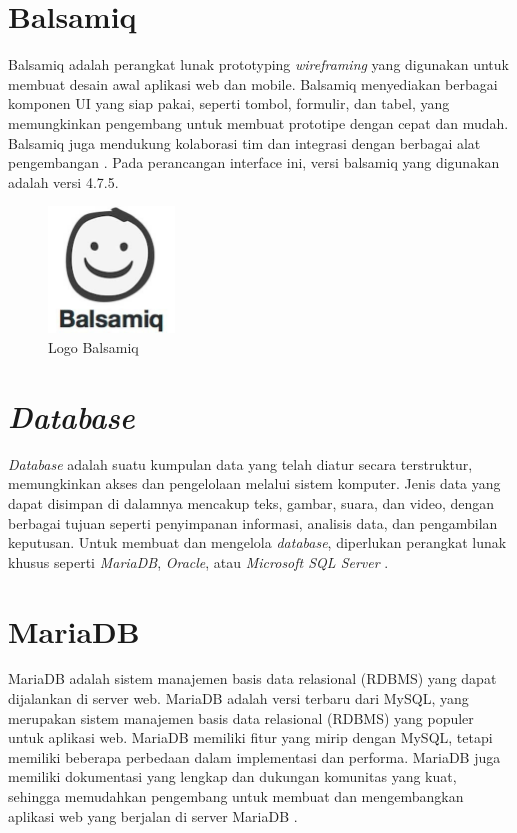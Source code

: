 \section{Balsamiq}
Balsamiq adalah perangkat lunak prototyping \textit{wireframing} yang digunakan untuk membuat desain awal aplikasi web dan mobile. Balsamiq menyediakan berbagai komponen UI yang siap pakai, seperti tombol, formulir, dan tabel, yang memungkinkan pengembang untuk membuat prototipe dengan cepat dan mudah. Balsamiq juga mendukung kolaborasi tim dan integrasi dengan berbagai alat pengembangan \cite{balsamiq}. Pada perancangan interface ini, versi balsamiq yang digunakan adalah versi 4.7.5.
\begin{figure}
	\centering
	\includegraphics[width=0.3\textwidth]{konten/gambar/balsamiq.jpg}
	\caption{Logo Balsamiq}
	\label{Balsamiq}
\end{figure}

\section{\textit{Database}}
\textit{Database} adalah suatu kumpulan data yang telah diatur secara terstruktur, memungkinkan akses dan pengelolaan melalui sistem komputer. Jenis data yang dapat disimpan di dalamnya mencakup teks, gambar, suara, dan video, dengan berbagai tujuan seperti penyimpanan informasi, analisis data, dan pengambilan keputusan. Untuk membuat dan mengelola \textit{database}, diperlukan perangkat lunak khusus seperti \textit{MariaDB}, \textit{Oracle}, atau \textit{Microsoft SQL Server} \cite{Cowls2021ADB}.

\section{MariaDB}
MariaDB adalah sistem manajemen basis data relasional (RDBMS) yang dapat dijalankan di server web. MariaDB adalah versi terbaru dari MySQL, yang merupakan sistem manajemen basis data relasional (RDBMS) yang populer untuk aplikasi web. MariaDB memiliki fitur yang mirip dengan MySQL, tetapi memiliki beberapa perbedaan dalam implementasi dan performa. MariaDB juga memiliki dokumentasi yang lengkap dan dukungan komunitas yang kuat, sehingga memudahkan pengembang untuk membuat dan mengembangkan aplikasi web yang berjalan di server MariaDB \cite{mariadb2024}.


